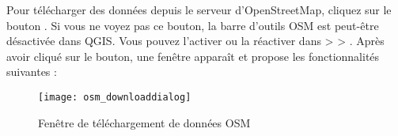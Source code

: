 Pour télécharger des données depuis le serveur d'OpenStreetMap, cliquez sur le bouton . Si vous ne voyez pas ce bouton, la barre d'outils OSM est peut-être désactivée dans QGIS. Vous pouvez l'activer ou la réactiver dans  >  > . Après avoir cliqué sur le bouton, une fenêtre apparaît et propose les fonctionnalités suivantes :

\begin{figure}[ht]
   \centering
   \texttt{[image: osm\_downloaddialog]}
   \caption{Fenêtre de téléchargement de données OSM \nixcaption}\label{fig:osmdownload}
\end{figure}

